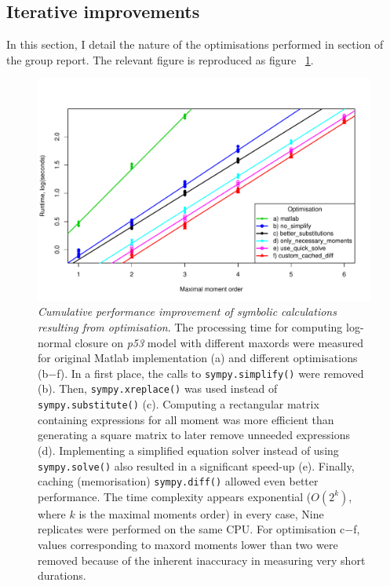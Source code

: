 \documentclass[11pt,a4paper]{article}
\newcommand{\pft}{\textit{p53}}
\newcommand{\citationneeded}[2][]{\todo[color=brown, fancyline, #1]{\textbf{Citation Needed:} #2}}
\begin{document}
 
\subsection{Iterative improvements}
In this section, I detail the nature of the optimisations performed in section\citationneeded{} of the group report.
The relevant figure is reproduced as figure ~\ref{fig:mea_speed}.

\begin{figure}[tbh]
\includegraphics[width=0.95\textwidth{}]{mea_speed.pdf}
\caption{\emph{Cumulative performance improvement of symbolic 
calculations resulting from optimisation}.
The processing time for computing log-normal closure on \pft{} model with different \gls{maxord}s were measured for original Matlab implementation (a) and different optimisations (b$-$f).
In a first place, the calls to \texttt{sympy.simplify()} were removed (b). 
Then, \texttt{sympy.xreplace()} was used instead of \texttt{sympy.substitute()} (c). 
Computing a rectangular matrix containing expressions for all moment was more efficient than generating a square matrix to later remove unneeded expressions (d).
Implementing a simplified equation solver instead of using \texttt{sympy.solve()} also resulted in a significant speed-up (e). 
Finally, caching (memorisation) \texttt{sympy.diff()} allowed even better performance.
The time complexity appears exponential ($O(2^k)$, where $k$ is the maximal moments order) in every case, 
Nine replicates were performed on the same CPU. 
For optimisation c$-$f, values corresponding to \gls{maxord} moments lower than two were removed because of
the inherent inaccuracy in measuring very short durations.}
\label{fig:mea_speed}
\end{figure}
\end{document}
